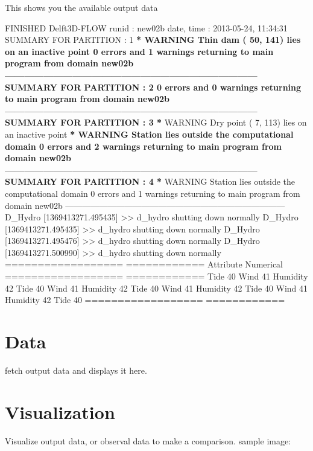 \documentclass[letterpaper,10pt,openany, oneside]{sphinxmanual}
\begin{document}
This shows you the available output data

FINISHED Delft3D-FLOW runid : new02b date, time : 2013-05-24, 11:34:31 SUMMARY FOR PARTITION : 1 \textbf{* WARNING Thin dam ( 50, 141) lies on an inactive point 0 errors and 1 warnings returning to main program from domain new02b ------------------------------------------------------------------------------ SUMMARY FOR PARTITION : 2 0 errors and 0 warnings returning to main program from domain new02b ------------------------------------------------------------------------------ SUMMARY FOR PARTITION : 3 *} WARNING Dry point ( 7, 113) lies on an inactive point \textbf{* WARNING Station lies outside the computational domain 0 errors and 2 warnings returning to main program from domain new02b ------------------------------------------------------------------------------ SUMMARY FOR PARTITION : 4 *} WARNING Station lies outside the computational domain 0 errors and 1 warnings returning to main program from domain new02b ------------------------------------------------------------------------------ D\_Hydro {[}1369413271.495435{]} \textgreater{}\textgreater{} d\_hydro shutting down normally D\_Hydro {[}1369413271.495435{]} \textgreater{}\textgreater{} d\_hydro shutting down normally D\_Hydro {[}1369413271.495476{]} \textgreater{}\textgreater{} d\_hydro shutting down normally D\_Hydro {[}1369413271.500990{]} \textgreater{}\textgreater{} d\_hydro shutting down normally
==================   ============
Attribute            Numerical
==================   ============
Tide                 40
Wind                 41
Humidity             42
Tide                 40
Wind                 41
Humidity             42
Tide                 40
Wind                 41
Humidity             42
Tide                 40
Wind                 41
Humidity             42
Tide                 40
==================   ============


\chapter{Data}
\label{data:data}\label{data::doc}
fetch output data and displays it here.


\chapter{Visualization}
\label{visualization:visualization}\label{visualization::doc}
Visualize output data, or observal data to make a comparison.
sample image:
\end{document}
